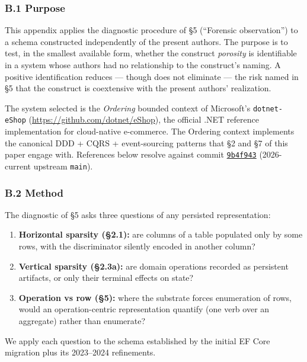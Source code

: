 \documentclass[
]{article}
\providecommand{\tightlist}{%
  \setlength{\itemsep}{0pt}\setlength{\parskip}{0pt}}
\let\origtexttt\texttt%
\renewcommand{\texttt}[1]{\origtexttt{\seqsplit{#1}}}%
\let\texttt\origtexttt%
\begin{document}
\subsubsection{B.1 Purpose}\label{b.1-purpose}

This appendix applies the diagnostic procedure of §5 (``Forensic
observation'') to a schema constructed independently of the present
authors. The purpose is to test, in the smallest available form, whether
the construct \emph{porosity} is identifiable in a system whose authors
had no relationship to the construct's naming. A positive identification
reduces --- though does not eliminate --- the risk named in §5 that the
construct is coextensive with the present authors' realization.

The system selected is the \emph{Ordering} bounded context of
Microsoft's \texttt{dotnet-eShop}
(\url{https://github.com/dotnet/eShop}), the official .NET reference
implementation for cloud-native e-commerce. The Ordering context
implements the canonical DDD + CQRS + event-sourcing patterns that §2
and §7 of this paper engage with. References below resolve against
commit
\href{https://github.com/dotnet/eShop/tree/9b4f9434f46fdc5c1a6e9e936af2868340cdbc48}{\texttt{9b4f943}}
(2026-current upstream \texttt{main}).

\subsubsection{B.2 Method}\label{b.2-method}

The diagnostic of §5 asks three questions of any persisted
representation:

\begin{enumerate}
\def\labelenumi{\arabic{enumi}.}
\tightlist
\item
  \textbf{Horizontal sparsity (§2.1):} are columns of a table populated
  only by some rows, with the discriminator silently encoded in another
  column?
\item
  \textbf{Vertical sparsity (§2.3a):} are domain operations recorded as
  persistent artifacts, or only their terminal effects on state?
\item
  \textbf{Operation vs row (§5):} where the substrate forces enumeration
  of rows, would an operation-centric representation quantify (one verb
  over an aggregate) rather than enumerate?
\end{enumerate}

We apply each question to the schema established by the initial EF Core
migration plus its 2023--2024 refinements.
\end{document}
